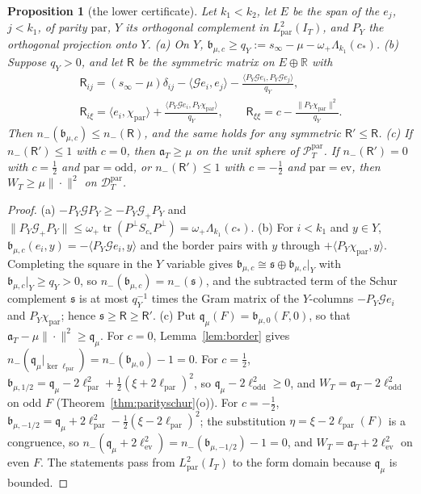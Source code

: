 \documentclass[10pt]{amsart}
\newtheorem{proposition}[theorem]{Proposition}
\theoremstyle{definition}
\theoremstyle{remark}
\newcommand{\R}{\mathbb R}
\newcommand{\PT}{\mathcal P_T}
\newcommand{\IT}{I_T}
\begin{document}
\begin{proposition}[the lower certificate]\label{prop:lowercert}
Let $k_1<k_2$, let $E$ be the span of the $e_j$, $j<k_1$, of parity $\mathrm{par}$, $Y$ its orthogonal
complement in $L^2_{\mathrm{par}}(\IT)$, and $P_Y$ the orthogonal projection onto $Y$.
\emph{(a)} On $Y$, $\mathfrak b_{\mu,c}\ge q_Y:=s_\infty-\mu-\omega_+\Lambda_{k_1}(c_*)$.
\emph{(b)} Suppose $q_Y>0$, and let $\mathsf R$ be the symmetric matrix on $E\oplus\R$ with
\[
\begin{gathered}
\mathsf R_{ij}=(s_\infty-\mu)\delta_{ij}-\langle\mathcal Ge_i,e_j\rangle
-\frac{\langle P_Y\mathcal Ge_i,P_Y\mathcal Ge_j\rangle}{q_Y},\\
\mathsf R_{i\xi}=\langle e_i,\chi_{\mathrm{par}}\rangle+\frac{\langle P_Y\mathcal Ge_i,P_Y\chi_{\mathrm{par}}\rangle}{q_Y},\qquad
\mathsf R_{\xi\xi}=c-\frac{\|P_Y\chi_{\mathrm{par}}\|^2}{q_Y}.
\end{gathered}
\]
Then $n_-(\mathfrak b_{\mu,c})\le n_-(\mathsf R)$, and the same holds for any symmetric $\mathsf R'\le\mathsf R$.
\emph{(c)} If $n_-(\mathsf R')\le1$ with $c=0$, then $\mathfrak a_T\ge\mu$ on the unit sphere of
$\PT^{\mathrm{par}}$. If $n_-(\mathsf R')=0$ with $c=\frac12$ and $\mathrm{par}=\mathrm{odd}$, or $n_-(\mathsf R')\le1$ with
$c=-\frac12$ and $\mathrm{par}=\mathrm{ev}$, then $W_T\ge\mu\|\cdot\|^2$ on $\mathcal D^{\mathrm{par}}_T$.
\end{proposition}
\begin{proof}\sloppy
(a) $-P_Y\mathcal GP_Y\ge-P_Y\mathcal G_+P_Y$ and
$\|P_Y\mathcal G_+P_Y\|\le\omega_+\operatorname{tr}(P^\perp S_{c_*}P^\perp)=\omega_+\Lambda_{k_1}(c_*)$.
(b) For $i<k_1$ and $y\in Y$, $\mathfrak b_{\mu,c}(e_i,y)=-\langle P_Y\mathcal Ge_i,y\rangle$ and the border pairs
with $y$ through $+\langle P_Y\chi_{\mathrm{par}},y\rangle$. Completing the square in the $Y$ variable gives $\mathfrak b_{\mu,c}\cong\mathfrak s\oplus\mathfrak b_{\mu,c}|_Y$ with
$\mathfrak b_{\mu,c}|_Y\ge q_Y>0$, so $n_-(\mathfrak b_{\mu,c})=n_-(\mathfrak s)$, and the subtracted term of the Schur
complement $\mathfrak s$ is at most $q_Y^{-1}$ times the Gram matrix of the $Y$-columns
$-P_Y\mathcal Ge_i$ and $P_Y\chi_{\mathrm{par}}$; hence $\mathfrak s\ge\mathsf R\ge\mathsf R'$.
(c) Put $\mathfrak q_\mu(F)=\mathfrak b_{\mu,0}(F,0)$, so that $\mathfrak a_T-\mu\|\cdot\|^2\ge\mathfrak q_\mu$. For
$c=0$, Lemma~\ref{lem:border} gives $n_-(\mathfrak q_\mu|_{\ker\ell_{\mathrm{par}}})=n_-(\mathfrak b_{\mu,0})-1=0$. For
$c=\frac12$, $\mathfrak b_{\mu,1/2}=\mathfrak q_\mu-2\ell_{\mathrm{par}}^2+\frac12(\xi+2\ell_{\mathrm{par}})^2$, so
$\mathfrak q_\mu-2\ell_{\mathrm{odd}}^2\ge0$, and $W_T=\mathfrak a_T-2\ell_{\mathrm{odd}}^2$ on odd $F$
(Theorem~\ref{thm:parityschur}(o)). For $c=-\frac12$,
$\mathfrak b_{\mu,-1/2}=\mathfrak q_\mu+2\ell_{\mathrm{par}}^2-\frac12(\xi-2\ell_{\mathrm{par}})^2$; the substitution
$\eta=\xi-2\ell_{\mathrm{par}}(F)$ is a congruence, so
$n_-(\mathfrak q_\mu+2\ell_{\mathrm{ev}}^2)=n_-(\mathfrak b_{\mu,-1/2})-1=0$, and $W_T=\mathfrak a_T+2\ell_{\mathrm{ev}}^2$ on even
$F$. The statements pass from $L^2_{\mathrm{par}}(\IT)$ to the form domain because $\mathfrak q_\mu$ is bounded.
\end{proof}
\end{document}
